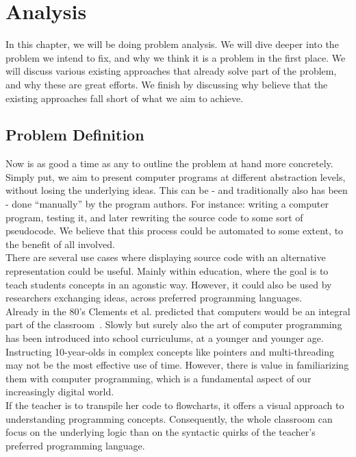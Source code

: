 \chapter{Analysis}

In this chapter, we will be doing problem analysis. We will dive deeper into the problem we intend to fix, and why we think it is a problem in the first place. We will discuss various existing approaches that already solve part of the problem, and why these are great efforts. We finish by discussing why believe that the existing approaches fall short of what we aim to achieve.

\section{Problem Definition}

Now is as good a time as any to outline the problem at hand more concretely. Simply put, we aim to present computer programs at different abstraction levels, without losing the underlying ideas. This can be - and traditionally also has been - done ``manually'' by the program authors. For instance: writing a computer program, testing it, and later rewriting the source code to some sort of pseudocode. We believe that this process could be automated to some extent, to the benefit of all involved. \hfill \\

There are several use cases where displaying source code with an alternative representation could be useful. Mainly within education, where the goal is to teach students concepts in an agonstic way. However, it could also be used by researchers exchanging ideas, across preferred programming languages. \hfill \\

Already in the 80's Clements et al. predicted that computers would be an integral part of the classroom~\cite{clements1984effects}. Slowly but surely also the art of computer programming has been introduced into school curriculums, at a younger and younger age. \hfill \\

Instructing 10-year-olds in complex concepts like pointers and multi-threading may not be the most effective use of time. However, there is value in familiarizing them with computer programming, which is a fundamental aspect of our increasingly digital world. \\

If the teacher is to transpile her code to flowcharts, it offers a visual approach to understanding programming concepts. Consequently, the whole classroom can focus on the underlying logic than on the syntactic quirks of the teacher's preferred programming language. \hfill \\ %


